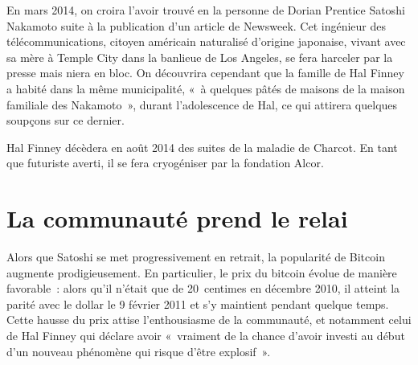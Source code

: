 En mars 2014, on croira l'avoir trouvé en la personne de Dorian Prentice Satoshi Nakamoto suite à la publication d'un article de Newsweek. Cet ingénieur des télécommunications, citoyen américain naturalisé d'origine japonaise, vivant avec sa mère à Temple City dans la banlieue de Los Angeles, se fera harceler par la presse mais niera en bloc. On découvrira cependant que la famille de Hal Finney a habité dans la même municipalité, «~à quelques pâtés de maisons de la maison familiale des Nakamoto~», durant l'adolescence de Hal, ce qui attirera quelques soupçons sur ce dernier.

Hal Finney décèdera en août 2014 des suites de la maladie de Charcot. En tant que futuriste averti, il se fera cryogéniser par la fondation Alcor.

\section*{La communauté prend le relai}

Alors que Satoshi se met progressivement en retrait, la popularité de Bitcoin augmente prodigieusement. En particulier, le prix du bitcoin évolue de manière favorable~: alors qu'il n'était que de 20~centimes en décembre 2010, il atteint la parité avec le dollar le 9 février 2011 et s'y maintient pendant quelque temps. Cette hausse du prix attise l'enthousiasme de la communauté, et notamment celui de Hal Finney qui déclare avoir «~vraiment de la chance d'avoir investi au début d'un nouveau phénomène qui risque d'être explosif~».


